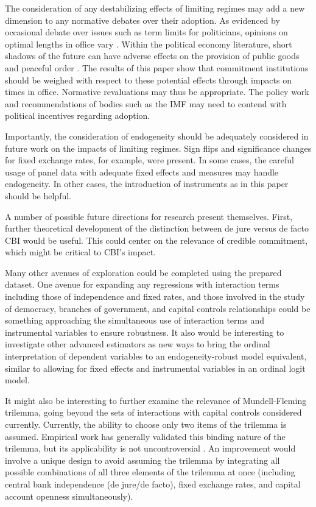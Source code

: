 \documentclass{article}
\begin{document}
    The consideration of any destabilizing effects of limiting regimes may add a new dimension to any normative debates over their adoption. As evidenced by occasional debate over issues such as term limits for politicians, opinions on optimal lengths in office vary \citep{greenberg_term_1994}. Within the political economy literature, short shadows of the future can have adverse effects on the provision of public goods and peaceful order \citep{olson_dictatorship_1993}. The results of this paper show that commitment institutions should be weighed with respect to these potential effects through impacts on times in office. Normative revaluations may thus be appropriate. The policy work and recommendations of bodies such as the IMF may need to contend with political incentives regarding adoption.

    Importantly, the consideration of endogeneity should be adequately considered in future work on the impacts of limiting regimes. Sign flips and significance changes for fixed exchange rates, for example, were present. In some cases, the careful usage of panel data with adequate fixed effects and measures may handle endogeneity. In other cases, the introduction of instruments as in this paper should be helpful.

    A number of possible future directions for research present themselves. First, further theoretical development of the distinction between de jure versus de facto CBI would be useful. This could center on the relevance of credible commitment, which might be critical to CBI's impact.
    
    Many other avenues of exploration could be completed using the prepared dataset. One avenue for expanding any regressions with interaction terms including those of independence and fixed rates, and those involved in the study of democracy, branches of government, and capital controls relationships could be something approaching the simultaneous use of interaction terms and instrumental variables to ensure robustness. It also would be interesting to investigate other advanced estimators as new ways to bring the ordinal interpretation of dependent variables to an endogeneity-robust model equivalent, similar to allowing for fixed effects and instrumental variables in an ordinal logit model.

    It might also be interesting to further examine the relevance of Mundell-Fleming trilemma, going beyond the sets of interactions with capital controls considered currently. Currently, the ability to choose only two items of the trilemma is assumed. Empirical work has generally validated this binding nature of the trilemma, but its applicability is not uncontroversial \citep{obstfeld_trilemma_2002}. An improvement would involve a unique design to avoid assuming the trilemma by integrating all possible combinations of all three elements of the trilemma at once (including central bank independence (de jure/de facto), fixed exchange rates, and capital account openness simultaneously).
\end{document}
